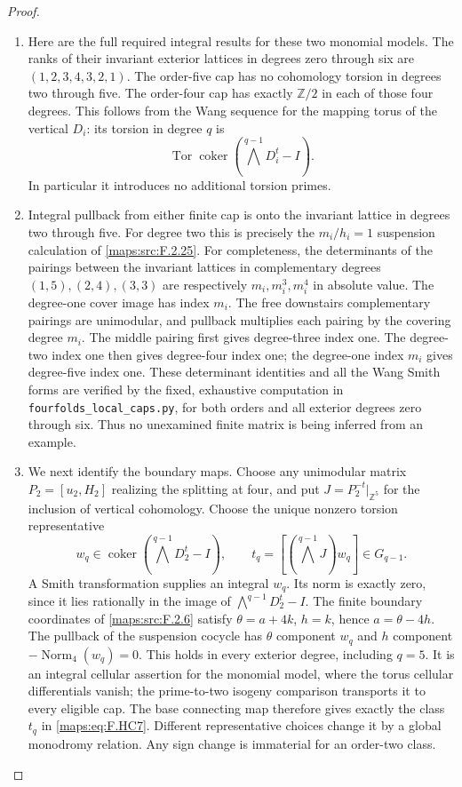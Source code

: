 \begin{proof}
\begin{enumerate}[label=\arabic*.]
\item Here are the full required integral results for these
two monomial models.
The ranks of their invariant exterior lattices in
degrees zero through six are
$(1,2,3,4,3,2,1)$.
The order-five cap has no cohomology torsion in degrees
two through five.
The order-four cap has exactly $\mathbb Z/2$ in each
of those four degrees.
This follows from the Wang sequence for the mapping
torus of the vertical $D_i$:
its torsion in degree $q$ is
\[
 \operatorname{Tor}\operatorname{coker}
       (\bigwedge^{q-1}D_i^t-I).
 \tag{F.HC6}\label{maps:eq:F.HC6}
\]
In particular it introduces no additional torsion primes.

\item Integral pullback from either finite cap is onto the
invariant lattice in degrees two through five.
For degree two this is precisely the $m_i/h_i=1$
suspension calculation of \ref{maps:src:F.2.25}.
For completeness, the determinants of the pairings between
the invariant lattices in complementary degrees
$(1,5),(2,4),(3,3)$ are respectively
$m_i,m_i^3,m_i^4$ in absolute value.
The degree-one cover image has index $m_i$.
The free downstairs complementary pairings are unimodular,
and pullback multiplies each pairing by the covering
degree $m_i$.
The middle pairing first gives degree-three index one.
The degree-two index one then gives degree-four index one;
the degree-one index $m_i$ gives degree-five index one.
These determinant identities and all the Wang Smith
forms are verified by the fixed, exhaustive computation
in \texttt{fourfolds\_local\_caps.py}, for both orders and
all exterior degrees zero through six.
Thus no unexamined finite matrix is being inferred from
an example.

\item We next identify the boundary maps.
Choose any unimodular matrix $P_2=[u_2,H_2]$ realizing
the splitting at four, and put
$J=P_2^{-t}|_{\mathbb Z^5}$ for the inclusion of vertical
cohomology.
Choose the unique nonzero torsion representative
\[
 w_q\in\operatorname{coker}
            (\bigwedge^{q-1}D_2^t-I),\qquad
 t_q=[(\bigwedge^{q-1}J)w_q]\in G_{q-1}.
 \tag{F.HC7}\label{maps:eq:F.HC7}
\]
A Smith transformation supplies an integral $w_q$.
Its norm is exactly zero, since it lies rationally in
the image of $\bigwedge^{q-1}D_2^t-I$.
The finite boundary coordinates of \ref{maps:src:F.2.6} satisfy
$\theta=a+4k$, $h=k$, hence $a=\theta-4h$.
The pullback of the suspension cocycle has $\theta$
component $w_q$ and $h$ component
$-\operatorname{Norm}_4(w_q)=0$.
This holds in every exterior degree, including $q=5$.
It is an integral cellular assertion for the monomial
model, where the torus cellular differentials vanish;
the prime-to-two isogeny comparison transports it to
every eligible cap.
The base connecting map therefore gives exactly the
class $t_q$ in \eqref{maps:eq:F.HC7}.
Different representative choices change it by a global
monodromy relation.  Any sign change is immaterial for
an order-two class.


\end{enumerate}
\end{proof}
